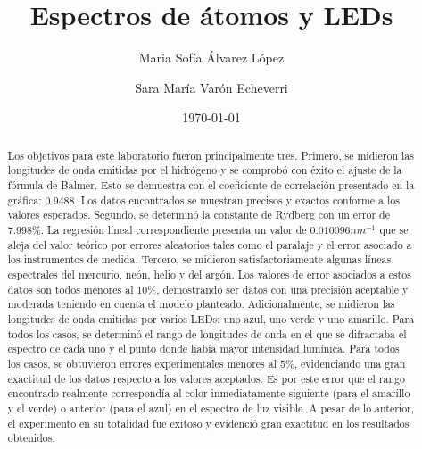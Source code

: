 \documentclass[%
 reprint,
 amsmath,amssymb,
 aps,
]{revtex4-1}
\begin{document}
\title{Espectros de átomos y LEDs}%

\author{Maria Sofía Álvarez López}%
%

\author{Sara María Varón Echeverri}
%

\date{\today}%

\begin{abstract}
Los objetivos para este laboratorio fueron principalmente tres. Primero, se midieron las longitudes de onda emitidas por el hidrógeno y se comprobó con éxito el ajuste de la fórmula de Balmer. Esto se demuestra con el coeficiente de correlación presentado en la gráfica: 0.9488. Los datos encontrados se muestran precisos y exactos conforme a los valores esperados. Segundo, se determinó la constante de Rydberg con un error de $7.998\%$. La regresión lineal correspondiente presenta un valor de $0.010096 nm^{-1}$ que se aleja del valor teórico por errores aleatorios tales como el paralaje y el error asociado a los instrumentos de medida. Tercero, se midieron satisfactoriamente algunas líneas espectrales del mercurio, neón, helio y del argón. Los valores de error asociados a estos datos son todos menores al $10\%$, demostrando ser datos con una precisión aceptable y moderada teniendo en cuenta el modelo planteado. Adicionalmente, se midieron las longitudes de onda emitidas por varios LEDs: uno azul, uno verde y uno amarillo. Para todos los casos, se determinó el rango de longitudes de onda en el que se difractaba el espectro de cada uno y el punto donde había mayor intensidad lumínica. Para todos los casos, se obtuvieron errores experimentales menores al $5\%$, evidenciando una gran exactitud de los datos respecto a los valores aceptados. Es por este error que el rango encontrado realmente correspondía al color inmediatamente siguiente (para el amarillo y el verde) o anterior (para el azul) en el espectro de luz visible. A pesar de lo anterior, el experimento en su totalidad fue exitoso y evidenció gran exactitud en los resultados obtenidos. 
\end{abstract}

\maketitle
\end{document}
